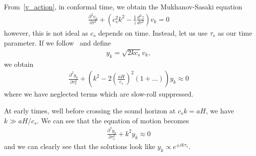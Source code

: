     From~\eqref{v_action}, in conformal time, we obtain the Mukhanov-Sasaki equation
    \begin{align}\label{modefneqn_tau}
        \frac{\partial^2 v_k}{\partial \tau^2} + \left(c_s^2k^2 - \frac{1}{z}\frac{d^2 z}{d \tau^2}\right)v_k = 0
    \end{align}
    however, this is not ideal as $c_s$ depends on time.
    Instead, let us use $\tau_s$ as our time parameter.
    If we follow~\cite{Hu_2011} and define
    \begin{align}
        y_k=\sqrt{2kc_s}v_k,
    \end{align}
    we obtain
    \begin{align}\label{modefneqn_tau_s}
        \frac{\partial^2 y_k}{\partial \tau_s^2} + \left(k^2 - 2\left(\frac{aH}{c_s}\right)^2(1+\ldots)\right)y_k \approx 0
    \end{align}
    where we have neglected terms which are slow-roll suppressed.


    At early times, well before crossing the sound horizon at $c_sk=aH$,
    we have $k\gg aH/c_s$. We can see that the equation of motion becomes
    \begin{align}
        \frac{\partial^2 y_k}{\partial \tau_s^2} + k^2 y_k \approx 0
    \end{align}
    and we can clearly see that the solutions look like $y_k\propto e^{\pm ik\tau_s}$.


